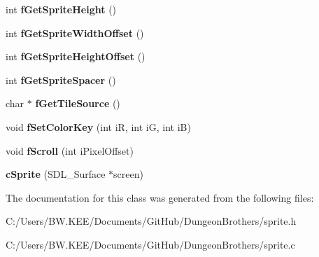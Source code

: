\begin{DoxyCompactItemize}
\item 
\hypertarget{classc_sprite_a03228f1a93a795392d83f433e243ff07}{int {\bfseries f\-Get\-Sprite\-Height} ()}\label{classc_sprite_a03228f1a93a795392d83f433e243ff07}

\item 
\hypertarget{classc_sprite_abb0ae63b1039d3caccdff9eafe6dd282}{int {\bfseries f\-Get\-Sprite\-Width\-Offset} ()}\label{classc_sprite_abb0ae63b1039d3caccdff9eafe6dd282}

\item 
\hypertarget{classc_sprite_ab710b29658c751f2988368d438b6f27f}{int {\bfseries f\-Get\-Sprite\-Height\-Offset} ()}\label{classc_sprite_ab710b29658c751f2988368d438b6f27f}

\item 
\hypertarget{classc_sprite_a406a292a0b156ddc716c3f6a4ac62f12}{int {\bfseries f\-Get\-Sprite\-Spacer} ()}\label{classc_sprite_a406a292a0b156ddc716c3f6a4ac62f12}

\item 
\hypertarget{classc_sprite_a81cab547630d110e9015cf2f85918e51}{char $\ast$ {\bfseries f\-Get\-Tile\-Source} ()}\label{classc_sprite_a81cab547630d110e9015cf2f85918e51}

\item 
\hypertarget{classc_sprite_a200e49fcedb589fa54139dc9cbd2f07e}{void {\bfseries f\-Set\-Color\-Key} (int i\-R, int i\-G, int i\-B)}\label{classc_sprite_a200e49fcedb589fa54139dc9cbd2f07e}

\item 
\hypertarget{classc_sprite_a972a2b30b9133cedd87fe455d52ce3bc}{void {\bfseries f\-Scroll} (int i\-Pixel\-Offset)}\label{classc_sprite_a972a2b30b9133cedd87fe455d52ce3bc}

\item 
\hypertarget{classc_sprite_abeebe92ab7bef34feec37b26f3ecd0a2}{{\bfseries c\-Sprite} (S\-D\-L\-\_\-\-Surface $\ast$screen)}\label{classc_sprite_abeebe92ab7bef34feec37b26f3ecd0a2}

\end{DoxyCompactItemize}


The documentation for this class was generated from the following files\-:\begin{DoxyCompactItemize}
\item 
C\-:/\-Users/\-B\-W.\-K\-E\-E/\-Documents/\-Git\-Hub/\-Dungeon\-Brothers/sprite.\-h\item 
C\-:/\-Users/\-B\-W.\-K\-E\-E/\-Documents/\-Git\-Hub/\-Dungeon\-Brothers/sprite.\-c\end{DoxyCompactItemize}
